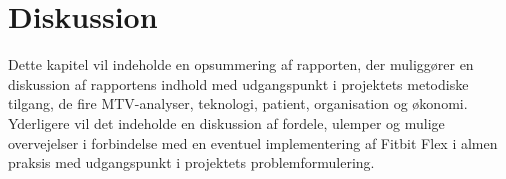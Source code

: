 \chapter{Diskussion}
Dette kapitel vil indeholde en opsummering af rapporten, der muliggører en diskussion af rapportens indhold med udgangspunkt i projektets metodiske tilgang, de fire MTV-analyser, teknologi, patient, organisation og økonomi. Yderligere vil det indeholde en diskussion af fordele, ulemper og mulige overvejelser i forbindelse med en eventuel implementering af Fitbit Flex i almen praksis med udgangspunkt i projektets problemformulering.







